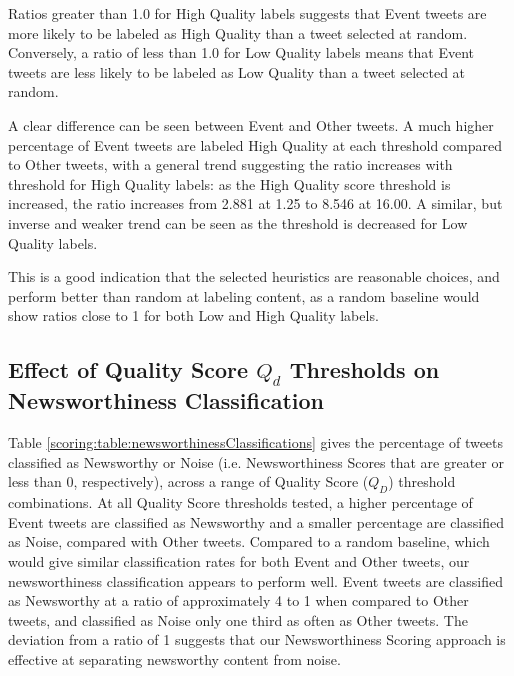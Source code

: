 Ratios greater than 1.0 for High Quality labels suggests that Event tweets are more likely to be labeled as High Quality than a tweet selected at random.
Conversely, a ratio of less than 1.0 for Low Quality labels means that Event tweets are less likely to be labeled as Low Quality than a tweet selected at random.

A clear difference can be seen between Event and Other tweets.
A much higher percentage of Event tweets are labeled High Quality at each threshold compared to Other tweets, with a general trend suggesting the ratio increases with threshold for High Quality labels:
as the High Quality score threshold is increased, the ratio increases from 2.881 at 1.25 to 8.546 at 16.00.
A similar, but inverse and weaker trend can be seen as the threshold is decreased for Low Quality labels.

This is a good indication that the selected heuristics are reasonable choices, and perform better than random at labeling content, as a random baseline would show ratios close to 1 for both Low and High Quality labels.

\subsection{Effect of Quality Score $Q_d$ Thresholds on Newsworthiness Classification}

Table \ref{scoring:table:newsworthinessClassifications} gives the percentage of tweets classified as Newsworthy or Noise (i.e. Newsworthiness Scores that are greater or less than 0, respectively), across a range of Quality Score ($Q_D$) threshold combinations.
At all Quality Score thresholds tested, a higher percentage of Event tweets are classified as Newsworthy and a smaller percentage are classified as Noise, compared with Other tweets.
Compared to a random baseline, which would give similar classification rates for both Event and Other tweets, our newsworthiness classification appears to perform well.
Event tweets are classified as Newsworthy at a ratio of approximately 4 to 1 when compared to Other tweets, and classified as Noise only one third as often as Other tweets.
The deviation from a ratio of 1 suggests that our Newsworthiness Scoring approach is effective at separating newsworthy content from noise.

